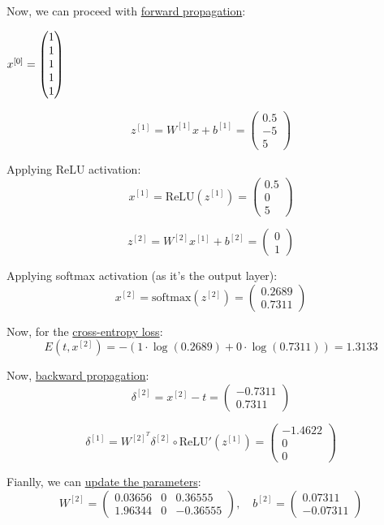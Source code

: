 \documentclass{article}
\begin{document}
\\
\\
Now, we can proceed with \underline{forward propagation}:

\( x\text{\textsuperscript{[0]}} = \begin{pmatrix} 1 \\ 1 \\ 1 \\ 1 \\ 1 \end{pmatrix} \)

\[
z^{[1]} = W^{[1]} x + b^{[1]} = \begin{pmatrix} 0.5 \\ -5 \\ 5 \end{pmatrix}
\]

Applying ReLU activation:
\[
x^{[1]} = \text{ReLU}(z^{[1]}) = \begin{pmatrix} 0.5 \\ 0 \\ 5 \end{pmatrix}
\]

\[
z^{[2]} = W^{[2]} x^{[1]} + b^{[2]} = \begin{pmatrix} 0 \\ 1 \end{pmatrix}
\]

Applying softmax activation (as it's the output layer):
\[
x^{[2]} = \text{softmax}(z^{[2]}) = \begin{pmatrix} 0.2689 \\ 0.7311 \end{pmatrix}
\]

Now, for the \underline{cross-entropy loss}:
\[
E(t, x^{[2]}) = - \left( 1 \cdot \log(0.2689) + 0 \cdot \log(0.7311) \right) = 1.3133
\]

Now, \underline{backward propagation}:
\[
\delta^{[2]} = x^{[2]} - t = \begin{pmatrix} -0.7311 \\ 0.7311 \end{pmatrix}
\]

\[
\delta^{[1]} = W^{[2]^T} \delta^{[2]} \circ \text{ReLU}'(z^{[1]}) = \begin{pmatrix} -1.4622 \\ 0 \\ 0 \end{pmatrix}
\]

Fianlly, we can \underline{update the parameters}:
\[
W^{[2]} = \begin{pmatrix} 0.03656 & 0 & 0.36555 \\ 1.96344 & 0 & -0.36555 \end{pmatrix}, \quad b^{[2]} = \begin{pmatrix} 0.07311 \\ -0.07311 \end{pmatrix}
\]
\end{document}
